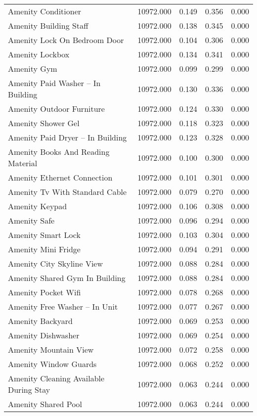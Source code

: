 \begin{tabular}{lllll}
Amenity Conditioner & 10972.000 & 0.149 & 0.356 & 0.000 \\
Amenity Building Staff & 10972.000 & 0.138 & 0.345 & 0.000 \\
Amenity Lock On Bedroom Door & 10972.000 & 0.104 & 0.306 & 0.000 \\
Amenity Lockbox & 10972.000 & 0.134 & 0.341 & 0.000 \\
Amenity Gym & 10972.000 & 0.099 & 0.299 & 0.000 \\
Amenity Paid Washer – In Building & 10972.000 & 0.130 & 0.336 & 0.000 \\
Amenity Outdoor Furniture & 10972.000 & 0.124 & 0.330 & 0.000 \\
Amenity Shower Gel & 10972.000 & 0.118 & 0.323 & 0.000 \\
Amenity Paid Dryer – In Building & 10972.000 & 0.123 & 0.328 & 0.000 \\
Amenity Books And Reading Material & 10972.000 & 0.100 & 0.300 & 0.000 \\
Amenity Ethernet Connection & 10972.000 & 0.101 & 0.301 & 0.000 \\
Amenity Tv With Standard Cable & 10972.000 & 0.079 & 0.270 & 0.000 \\
Amenity Keypad & 10972.000 & 0.106 & 0.308 & 0.000 \\
Amenity Safe & 10972.000 & 0.096 & 0.294 & 0.000 \\
Amenity Smart Lock & 10972.000 & 0.103 & 0.304 & 0.000 \\
Amenity Mini Fridge & 10972.000 & 0.094 & 0.291 & 0.000 \\
Amenity City Skyline View & 10972.000 & 0.088 & 0.284 & 0.000 \\
Amenity Shared Gym In Building & 10972.000 & 0.088 & 0.284 & 0.000 \\
Amenity Pocket Wifi & 10972.000 & 0.078 & 0.268 & 0.000 \\
Amenity Free Washer – In Unit & 10972.000 & 0.077 & 0.267 & 0.000 \\
Amenity Backyard & 10972.000 & 0.069 & 0.253 & 0.000 \\
Amenity Dishwasher & 10972.000 & 0.069 & 0.254 & 0.000 \\
Amenity Mountain View & 10972.000 & 0.072 & 0.258 & 0.000 \\
Amenity Window Guards & 10972.000 & 0.068 & 0.252 & 0.000 \\
Amenity Cleaning Available During Stay & 10972.000 & 0.063 & 0.244 & 0.000 \\
Amenity Shared Pool & 10972.000 & 0.063 & 0.244 & 0.000 \\

\end{tabular}
